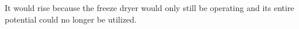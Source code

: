 It would rise because the freeze dryer would only still be operating and its entire potential could no longer be utilized.